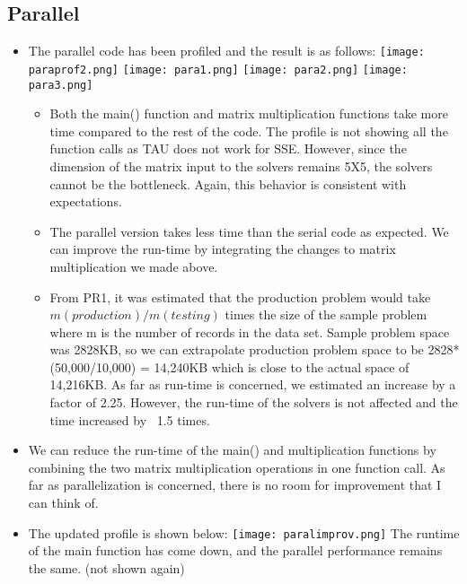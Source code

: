 \documentclass{article}
\begin{document}
\begin{spacing}{1.1}
\subsection{Parallel}
\begin{itemize}
\item The parallel code has been profiled and the result is as follows: \newline \newline
\texttt{[image: paraprof2.png]}
\texttt{[image: para1.png]}
\texttt{[image: para2.png]}
\texttt{[image: para3.png]}
\begin{itemize}
\item Both the main() function and matrix multiplication functions take more time compared to the rest of the code. The profile is not showing all the function calls as TAU does not work for SSE. However, since the dimension of the matrix input to the solvers remains 5X5, the solvers cannot be the bottleneck. Again, this behavior is consistent with expectations.
\item The parallel version takes less time than the serial code as expected. We can improve the run-time by integrating the changes to matrix multiplication we made above.
\item From PR1, it was estimated that the production problem would take $m(production)/m(testing)$ times the size of the sample problem where m is the number of records in the data set. Sample problem space was 2828KB, so we can extrapolate production problem space to be 2828*(50,000/10,000) = 14,240KB which is close to the actual space of 14,216KB. As far as run-time is concerned, we estimated an increase by a factor of 2.25. However, the run-time of the solvers is not affected and the time increased by ~1.5 times. 
\end{itemize}
\item We can reduce the run-time of the main() and multiplication functions by combining the two matrix multiplication operations in one function call. As far as parallelization is concerned, there is no room for improvement that I can think of.
\item The updated profile is shown below: \newline \newline
\texttt{[image: paralimprov.png]} 
The runtime of the main function has come down, and the parallel performance remains the same. (not shown again)
\end{itemize}


\end{spacing}
\end{document}
